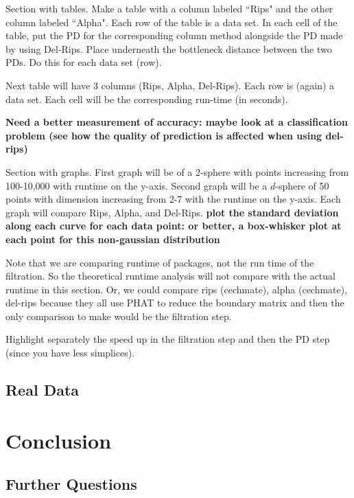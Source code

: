 \documentclass[letterpaper,titlepage]{article}
\begin{document}
    Section with tables. Make a table with a column labeled ``Rips" and the other column labeled ``Alpha". Each row of the table is a data set. In each cell of the table, put the PD for the corresponding column method alongside the PD made by using Del-Rips. Place underneath the bottleneck distance between the two PDs. Do this for each data set (row).

    Next table will have 3 columns (Rips, Alpha, Del-Rips). Each row is (again) a data set. Each cell will be the corresponding run-time (in seconds).
       
    \textbf{Need a better measurement of accuracy: maybe look at a classification problem (see how the quality of prediction is affected when using del-rips)}

    Section with graphs. First graph will be of a 2-sphere with points increasing from 100-10,000 with runtime on the y-axis. Second graph will be a $d$-sphere of 50 points with dimension increasing from 2-7 with the runtime on the y-axis. Each graph will compare Rips, Alpha, and Del-Rips.
    \textbf{plot the standard deviation along each curve for each data point: or better, a box-whisker plot at each point for this non-gaussian distribution}
    
    Note that we are comparing runtime of packages, not the run time of the filtration. So the theoretical runtime analysis will not compare with the actual runtime in this section. Or, we could compare rips (cechmate), alpha (cechmate), del-rips because they all use PHAT to reduce the boundary matrix and then the only comparison to make would be the filtration step.
    
    Highlight separately the speed up in the filtration step and then the PD step (since you have less simplices).


\subsection{Real Data}



\section{Conclusion}



\subsection{Further Questions}
\end{document}
